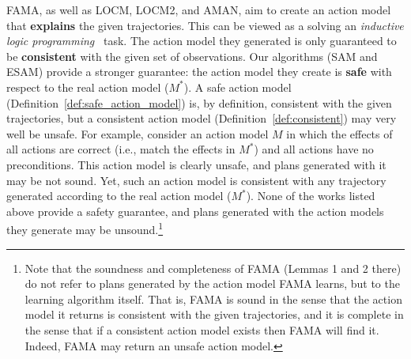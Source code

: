 \documentclass{article}
\newcommand{\realm}{\ensuremath{M^*}\xspace}
\begin{document}
FAMA, as well as LOCM, LOCM2, and AMAN, aim to create an action model that \textbf{explains} the given trajectories. This can be viewed as a solving an \emph{inductive logic programming}~\cite{muggleton1994inductive} task. 
The action model they generated is only guaranteed to be \textbf{consistent} with the given set of observations.
Our algorithms (SAM and ESAM) provide a stronger guarantee: the action model they create is \textbf{safe} with respect to the real action model ($\realm$). 
A safe action model (Definition~\ref{def:safe_action_model}) is, by definition, consistent with the given trajectories, 
but a consistent action model (Definition~\ref{def:consistent}) may very well be unsafe. For example, consider an action model $M$ in which the effects of all actions are correct (i.e., match the effects in $\realm$) and all actions have no preconditions. This action model is clearly unsafe, and plans generated with it may be not sound. Yet, such an action model is consistent with any trajectory generated according to the real action model ($\realm$). 
None of the works listed above provide a safety guarantee, and plans generated with the action models they generate may be unsound.\footnote{Note that the soundness and completeness of FAMA (Lemmas 1 and 2 there) do not refer to plans generated by the action model FAMA learns, but to the learning algorithm itself. 
That is, FAMA is sound in the sense that the action model it returns is consistent with the given trajectories, and it is complete in the sense that if a consistent action model exists then FAMA will find it. Indeed, FAMA may return an unsafe action model.}
\end{document}

